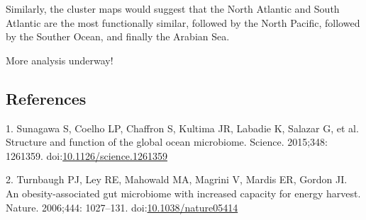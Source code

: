 \documentclass[12pt,a4paper,twocolumn]{article}
\begin{document}
Similarly, the cluster maps would suggest that the North Atlantic and
South Atlantic are the most functionally similar, followed by the North
Pacific, followed by the Souther Ocean, and finally the Arabian Sea.

More analysis underway!

\subsection*{References}\label{references}

\hypertarget{refs}{}
\hypertarget{ref-sunagawa_structure_2015}{}
1. Sunagawa S, Coelho LP, Chaffron S, Kultima JR, Labadie K, Salazar G,
et al. Structure and function of the global ocean microbiome. Science.
2015;348: 1261359.
doi:\href{https://doi.org/10.1126/science.1261359}{10.1126/science.1261359}

\hypertarget{ref-turnbaugh_obesity-associated_2006}{}
2. Turnbaugh PJ, Ley RE, Mahowald MA, Magrini V, Mardis ER, Gordon JI.
An obesity-associated gut microbiome with increased capacity for energy
harvest. Nature. 2006;444: 1027--131.
doi:\href{https://doi.org/10.1038/nature05414}{10.1038/nature05414}
\end{document}

